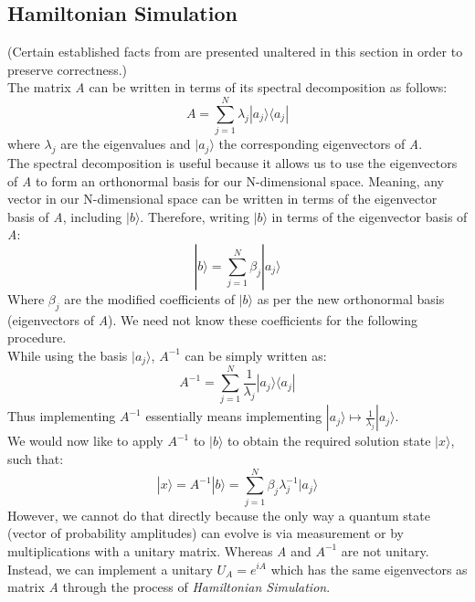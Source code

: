 \documentclass[12pt]{article}
\begin{document}
\subsection{Hamiltonian Simulation}
(Certain established facts from \cite{Wolf} are presented unaltered in this section in order to preserve correctness.)\\
The matrix \emph{A} can be written in terms of its spectral decomposition as follows: 
\begin{equation} \label{eq5}
    A = \sum_{j=1}^{N} \lambda_j |a_j\rangle \langle a_j|
\end{equation}
where $\lambda_j$ are the eigenvalues and $|a_j\rangle$ the corresponding eigenvectors of \emph{A}.\\
The spectral decomposition is useful because it allows us to use the eigenvectors of \emph{A} to form an orthonormal basis for our N-dimensional space. Meaning, any vector in our N-dimensional space can be written in terms of the eigenvector basis of \emph{A}, including $|b\rangle$. Therefore, writing $|b\rangle$ in terms of the eigenvector basis of \emph{A}: 
\begin{equation} \label{eq6}
    |b\rangle = \sum_{j=1}^{N} \beta_j |a_j\rangle
\end{equation}
Where $\beta_j$ are the modified coefficients of $|b\rangle$ as per the new orthonormal basis (eigenvectors of \emph{A}). We need not know these coefficients for the following procedure.\\
While using the basis $|a_j\rangle$, $A^{-1}$ can be simply written as: 
\begin{equation} \label{eq7}
    A^{-1} = \sum_{j=1}^{N} \frac{1}{\lambda_j} |a_j\rangle \langle a_j|
\end{equation}
Thus implementing $A^{-1}$ essentially means implementing $|a_j\rangle \mapsto \frac{1}{\lambda_j} |a_j\rangle$.\\
We would now like to apply $A^{-1}$ to $|b\rangle$ to obtain the required solution state $|x\rangle$, such that:
\begin{equation} \label{eq8}
    |x\rangle = A^{-1} |b\rangle = \sum_{j=1}^{N} \beta_j \lambda^{-1}_j |a_j\rangle
\end{equation}
However, we cannot do that directly because the only way a quantum state (vector of probability amplitudes) can evolve is via measurement or by multiplications with a unitary matrix. Whereas \emph{A} and $A^{-1}$ are not unitary.
\\
Instead, we can implement a unitary $U_A = e^{iA}$ which has the same eigenvectors as matrix \emph{A} through the process of \emph{Hamiltonian Simulation}.
\end{document}
